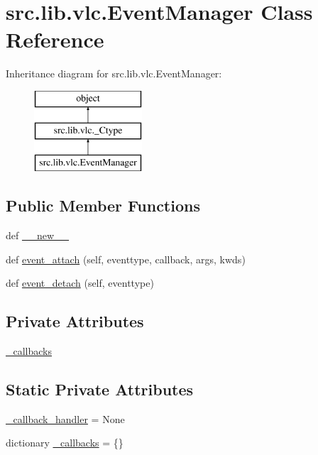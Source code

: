 \hypertarget{classsrc_1_1lib_1_1vlc_1_1EventManager}{}\section{src.\+lib.\+vlc.\+Event\+Manager Class Reference}
\label{classsrc_1_1lib_1_1vlc_1_1EventManager}
Inheritance diagram for src.\+lib.\+vlc.\+Event\+Manager\+:\begin{figure}[H]
\begin{center}
\leavevmode
\includegraphics[height=3.000000cm]{classsrc_1_1lib_1_1vlc_1_1EventManager}
\end{center}
\end{figure}
\subsection*{Public Member Functions}
\begin{DoxyCompactItemize}
\item 
def \hyperlink{classsrc_1_1lib_1_1vlc_1_1EventManager_a29af220e01df1ed851e47e814f510ae8}{\+\_\+\+\_\+new\+\_\+\+\_\+}
\item 
def \hyperlink{classsrc_1_1lib_1_1vlc_1_1EventManager_a1f9f75744696ef79235485c25243d967}{event\+\_\+attach} (self, eventtype, callback, args, kwds)
\item 
def \hyperlink{classsrc_1_1lib_1_1vlc_1_1EventManager_ade3c764c0bf826d28c3845e94c1ee1c5}{event\+\_\+detach} (self, eventtype)
\end{DoxyCompactItemize}
\subsection*{Private Attributes}
\begin{DoxyCompactItemize}
\item 
\hyperlink{classsrc_1_1lib_1_1vlc_1_1EventManager_a50815d3eaa5da503c6a966ab9f2acce1}{\+\_\+callbacks}
\end{DoxyCompactItemize}
\subsection*{Static Private Attributes}
\begin{DoxyCompactItemize}
\item 
\hyperlink{classsrc_1_1lib_1_1vlc_1_1EventManager_ad477af10daa2903a52bc0f142fca198d}{\+\_\+callback\+\_\+handler} = None
\item 
dictionary \hyperlink{classsrc_1_1lib_1_1vlc_1_1EventManager_a3cbe5bf81d4bf18946cf50aa1383766c}{\+\_\+callbacks} = \{\}
\end{DoxyCompactItemize}
